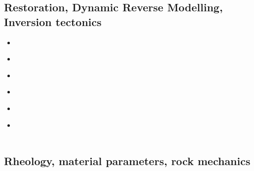 \subsection{Restoration, Dynamic Reverse Modelling, Inversion tectonics}

\begin{scriptsize}
\begin{itemize}
\item[\twothousandone] 
\textcite{istv01} \\
\item[\twothousandfour] 
\textcite{istt04} \\
\item[\twothousandfive] 
\textcite{koma05} \\
\item[\twothousandtwelve] 
\textcite{lofg12} \\
\item[\twothousandeighteen] 
\textcite{lojm18} \\
\item[\twothousandtwenty] 
\textcite{sctc20} \\
\textcite{taas20} \\
\end{itemize}
\end{scriptsize}

\subsection{Rheology, material parameters, rock mechanics}

